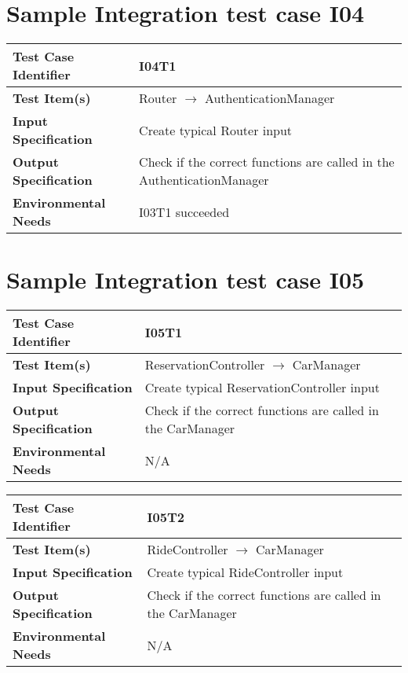 \section{Sample Integration test case I04}\label{I04}
\begin{center}
	\vspace{0.6cm}
	\begin{tabular}{|l|l|}
		\hline
		\textbf{Test Case Identifier} & I04T1 \bigstrut \\\hline
		\textbf{Test Item(s)} & Router \ensuremath{\rightarrow} AuthenticationManager \bigstrut \\\hline
		\textbf{Input Specification} & Create typical Router input \bigstrut \\\hline
		\textbf{Output Specification} & Check if the correct functions are called in the AuthenticationManager \bigstrut \\\hline
		\textbf{Environmental Needs} & I03T1 succeeded \bigstrut \\\hline
	\end{tabular}
\end{center}

\section{Sample Integration test case I05}\label{I05}
\begin{center}
	\vspace{0.6cm}
	\begin{tabular}{|l|l|}
		\hline
		\textbf{Test Case Identifier} & I05T1 \bigstrut \\\hline
		\textbf{Test Item(s)} & ReservationController \ensuremath{\rightarrow} CarManager \bigstrut \\\hline
		\textbf{Input Specification} & Create typical ReservationController input \bigstrut \\\hline
		\textbf{Output Specification} & Check if the correct functions are called in the CarManager \bigstrut \\\hline
		\textbf{Environmental Needs} & N/A \bigstrut \\\hline
	\end{tabular}
\end{center}

\begin{center}
	\vspace{0.6cm}
	\begin{tabular}{|l|l|}
		\hline
		\textbf{Test Case Identifier} & I05T2 \bigstrut \\\hline
		\textbf{Test Item(s)} & RideController \ensuremath{\rightarrow} CarManager \bigstrut \\\hline
		\textbf{Input Specification} & Create typical RideController input \bigstrut \\\hline
		\textbf{Output Specification} & Check if the correct functions are called in the CarManager \bigstrut \\\hline
		\textbf{Environmental Needs} & N/A \bigstrut \\\hline
	\end{tabular}
\end{center}


